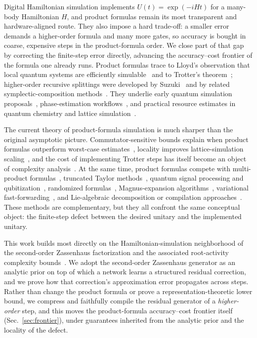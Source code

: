 \documentclass[aps,prxquantum,reprint,superscriptaddress,nofootinbib,amsmath,amssymb]{revtex4-2}
\begin{document}
Digital Hamiltonian simulation implements $U(t)=\exp(-iHt)$ for a many-body Hamiltonian $H$, and product formulas remain its most transparent and hardware-aligned route. They also impose a hard trade-off: a smaller error demands a higher-order formula and many more gates, so accuracy is bought in coarse, expensive steps in the product-formula order. We close part of that gap by correcting the finite-step error directly, advancing the accuracy--cost frontier of the formula one already runs. Product formulas trace to Lloyd's observation that local quantum systems are efficiently simulable~\cite{lloyd1996} and to Trotter's theorem~\cite{trotter1959}; higher-order recursive splittings were developed by Suzuki~\cite{suzuki1990,suzuki1991,suzuki1993} and by related symplectic-composition methods~\cite{yoshida1990,forest1990,chin1997,hatano2005,wiebe2010}. They underlie early quantum simulation proposals~\cite{abrams1997,sornborger1999,ortiz2001}, phase-estimation workflows~\cite{kitaev1997,kitaev2002,abrams1999,cleve1998}, and practical resource estimates in quantum chemistry and lattice simulation~\cite{aspuruguzik2005,wecker2014,wecker2015,babbush2015,reiher2017,kivlichan2018,haah2021}.

The current theory of product-formula simulation is much sharper than the original asymptotic picture. Commutator-sensitive bounds explain when product formulas outperform worst-case estimates~\cite{childs2021,layden2022,zhuk2023}, locality improves lattice-simulation scaling~\cite{childs2019lattice,lieb1972,tran2020}, and the cost of implementing Trotter steps has itself become an object of complexity analysis~\cite{low2023pra}. At the same time, product formulas compete with multi-product formulas~\cite{childs2012mpf}, truncated Taylor methods~\cite{berry2015prl}, quantum signal processing and qubitization~\cite{berry2007,berry2014,low2017qsp,low2019qubitization}, randomized formulas~\cite{campbell2019,ouyang2020,childs2022,chen2022a}, Magnus-expansion algorithms~\cite{magnus1954,blanes2009,sharma2024,fang2025}, variational fast-forwarding~\cite{cirstoiu2020}, and Lie-algebraic decomposition or compilation approaches~\cite{kokcu2022,steckmann2023,wu2023,zeier2011}. These methods are complementary, but they all confront the same conceptual object: the finite-step defect between the desired unitary and the implemented unitary.

This work builds most directly on the Hamiltonian-simulation neighborhood of the
second-order Zassenhaus factorization and the associated root-activity
complexity bounds~\cite{nguyen2025zassenhaus,jing2026complexity}. We adopt the
second-order Zassenhaus generator as an analytic prior on top of which a network
learns a structured residual correction, and we prove how that correction's
approximation error propagates across steps. Rather than change the product
formula or prove a representation-theoretic lower bound, we compress and
faithfully compile the residual generator of a \emph{higher-order} step, and this
moves the product-formula accuracy--cost frontier itself
(Sec.~\ref{sec:frontier}), under guarantees inherited from the analytic prior and
the locality of the defect.
\end{document}

